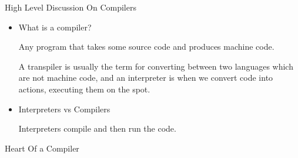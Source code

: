 \documentclass{report}
\begin{document}
\large{High Level Discussion On Compilers}
\begin{itemize}
    \item What is a compiler?
        \begin{mdframed}
            Any program that takes some source code
            and produces machine code.

            A transpiler is usually the term for converting
            between two languages which are not machine code,
            and an interpreter is when we convert code into
            actions, executing them on the spot.
        \end{mdframed}
    \item Interpreters vs Compilers
        \begin{mdframed}
            Interpreters compile and then run the code.
        \end{mdframed}
\end{itemize}
Heart Of a Compiler
\end{document}
